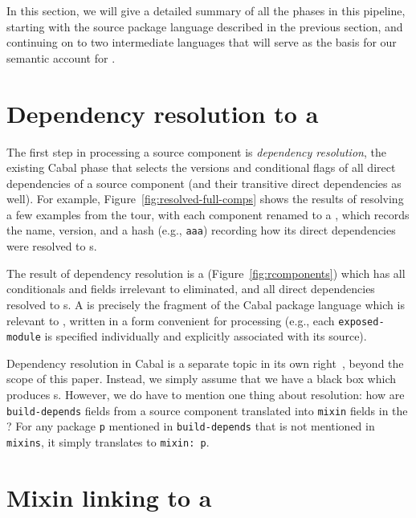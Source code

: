 In this section, we will give a detailed summary of all the phases in
this pipeline, starting with the source package language described in
the previous section, and continuing on to two intermediate languages
that will serve as the basis for our semantic account for \Backpack{}.

\section{Dependency resolution to a \ccomp{}}

The first step in
processing a source component is \emph{dependency resolution},
the existing Cabal phase that
selects the versions and conditional flags of all direct dependencies of
a source component (and their transitive direct dependencies as well).
For example, Figure~\ref{fig:resolved-full-comps} shows the results
of resolving a few examples from the tour, with each component renamed to
a \cid{}, which records the name, version, and a hash (e.g., \verb|aaa|)
recording how its direct dependencies were resolved to \cid{}s.

The result of dependency resolution is a \emph{\ccomp}
(Figure~\ref{fig:rcomponents}) which has all conditionals and fields
irrelevant to \Backpack{} eliminated, and all direct dependencies
resolved to \cid{}s.  A \ccomp{} is precisely the fragment of the
Cabal package language which is relevant to \Backpack{}, written in a
form convenient for processing (e.g., each \verb|exposed-module| is
specified individually and explicitly associated with its source).

Dependency resolution in Cabal is a separate topic in its own
right~\cite{well-typed-solver, well-typed-qualified}, beyond the scope of this paper.
Instead, we simply assume that we have a black box which
produces \ccomp{}s.  However, we do have to mention one thing about resolution:
how are \verb|build-depends| fields from
a source component translated into \verb|mixin| fields in the
\ccomp{}?  For any package \verb|p|
mentioned in \verb|build-depends| that is not mentioned in
\verb|mixins|, it simply translates to
\verb|mixin: p|.



\section{Mixin linking to a \unit{}}
\label{sec:overview-mixin}

